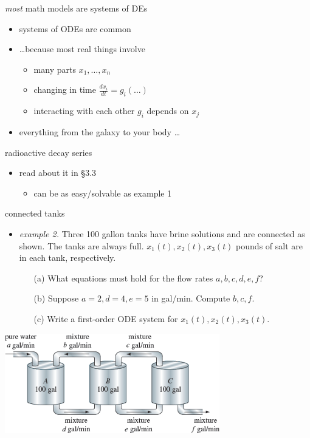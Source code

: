 \documentclass[urlcolor=blue,dvipsnames]{beamer}
\begin{document}
\begin{frame}{\emph{most} math models are systems of DEs}

\begin{itemize}
\item systems of ODEs are \alert{common}
\item \dots because most real things involve

    \begin{itemize}
    \item \alert{many parts} \hfill $x_1,\dots,x_n$
    \item \alert{changing in time} \hfill $\frac{dx_i}{dt}=g_i(\dots)$
    \item \alert{interacting with each other} \hfill $g_i$ depends on $x_j$
    \end{itemize}
\item everything from the galaxy to your body \dots
\end{itemize}
\end{frame}


\begin{frame}{radioactive decay series}

\begin{itemize}
\item read about it in \S3.3

    \begin{itemize}
    \item can be as easy/solvable as example 1
    \end{itemize}
\end{itemize}
\end{frame}


\begin{frame}{connected tanks}

\begin{itemize}
\item \emph{example 2.}  Three 100 gallon tanks have brine solutions and are connected as shown.  The tanks are always full.  $x_1(t),x_2(t),x_3(t)$ pounds of salt are in each tank, respectively.
    \begin{itemize}
    \item[(a)] What equations must hold for the flow rates $a,b,c,d,e,f$?
    \item[(b)] Suppose $a=2,d=4,e=5$ in gal/min.  Compute $b,c,f$.
    \item[(c)] Write a first-order ODE system for $x_1(t),x_2(t),x_3(t)$.
    \end{itemize}
\end{itemize}

\begin{center}
\includegraphics[width=0.7\textwidth]{figs/three-tanks}
\end{center}
\end{frame}
\end{document}
